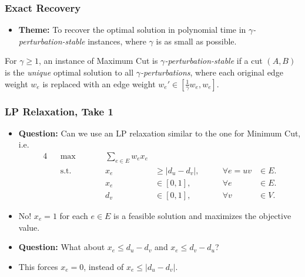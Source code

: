\documentclass{beamer}
\begin{document}
    \begin{frame}
        \frametitle{Exact Recovery}
    
        \begin{itemize}
            \item {\bf Theme:} To recover the optimal solution in polynomial time in \emph{$\gamma$-perturbation-stable} instances, where $\gamma$ is as small as possible.
        \end{itemize}

        \pause

        \begin{definition}
            For $\gamma \geq 1$, an instance of {\sc Maximum Cut} is \emph{$\gamma$-perturbation-stable} if a cut $(A, B)$ is the \emph{unique} optimal solution to all \emph{$\gamma$-perturbations}, where each original edge weight $w_e$ is replaced with an edge weight $w_e' \in [\frac{1}{\gamma} w_e, w_e]$.
        \end{definition}
    \end{frame}

    \begin{frame}
        \frametitle{LP Relaxation, Take 1}
    
        \begin{itemize}
            \item {\bf Question:} Can we use an LP relaxation similar to the one for {\sc Minimum Cut}, i.e.
            \begin{alignat*}{4}
                && \max \qquad && \sum_{e \in E} w_e x_e \\
                && \text{s.t.} \qquad && x_e & \geq \left|d_u - d_v\right|, & \qquad \forall e = uv & \in E. \\
                && && x_e & \in [0, 1], & \qquad \forall e & \in E. \\
                && && d_v & \in [0, 1], & \qquad \forall v & \in V.
              \end{alignat*}
              \pause
              \vspace{-1em}
              \item No! $x_e = 1$ for each $e \in E$ is a feasible solution and maximizes the objective value. \pause
              \item {\bf Question:} What about $x_e \leq d_u - d_v$ and $x_e \leq d_v - d_u$? \pause
              \item This forces $x_e = 0$, instead of $x_e \leq |d_u - d_v|$.
        \end{itemize}
    \end{frame}
\end{document}
